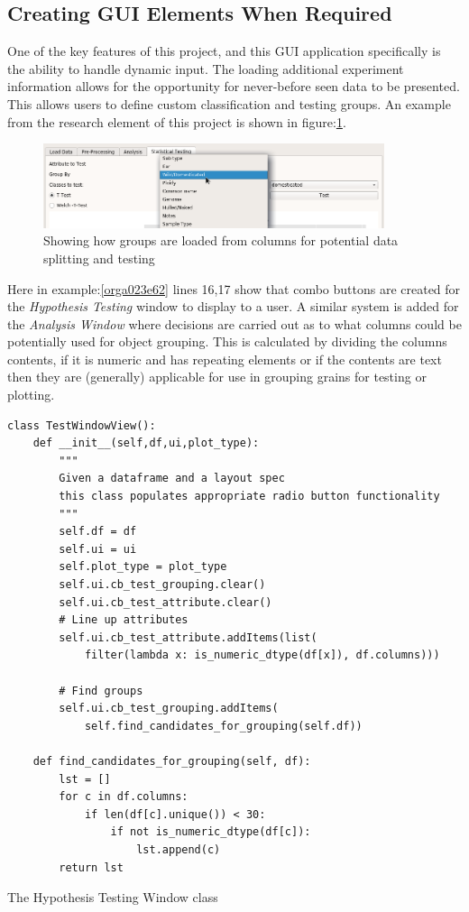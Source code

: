 \documentclass[11pt]{report}
\begin{document}
\subsection{Creating GUI Elements When Required}
\label{sec:org2fa7012}

One of the key features of this project, and this GUI application specifically is the ability to handle dynamic input. The loading additional experiment information allows for the opportunity for never-before seen data to be presented. This allows users to define custom classification and testing groups. An example from the research element of this project is shown in figure:\ref{fig:org3238c19}.

\begin{figure}[htbp]
\centering
\includegraphics[width=10cm]{./images/dynamicselection.png}
\caption{\label{fig:org3238c19}
Showing how groups are loaded from columns for potential data splitting and testing}
\end{figure}

Here in example:\ref{orga023e62} lines 16,17 show that combo buttons are created for the \emph{Hypothesis Testing} window to display to a user. A similar system is added for the \emph{Analysis Window} where decisions are carried out as to what columns could be potentially used for object grouping. This is calculated by dividing the columns contents, if it is numeric and has repeating elements or if the contents are text then they are (generally) applicable for use in grouping grains for testing or plotting.

\begin{listing}[htbp]
\begin{verbatim}
class TestWindowView():
    def __init__(self,df,ui,plot_type):
        """
        Given a dataframe and a layout spec
        this class populates appropriate radio button functionality
        """
        self.df = df
        self.ui = ui
        self.plot_type = plot_type
        self.ui.cb_test_grouping.clear()
        self.ui.cb_test_attribute.clear()
        # Line up attributes
        self.ui.cb_test_attribute.addItems(list(
            filter(lambda x: is_numeric_dtype(df[x]), df.columns)))

        # Find groups
        self.ui.cb_test_grouping.addItems(
            self.find_candidates_for_grouping(self.df))

    def find_candidates_for_grouping(self, df):
        lst = []
        for c in df.columns:
            if len(df[c].unique()) < 30:
                if not is_numeric_dtype(df[c]):
                    lst.append(c)
        return lst
\end{verbatim}
\caption{\label{orga023e62}
The Hypothesis Testing Window class}
\end{listing}
\end{document}
